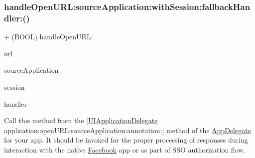 \subsubsection{\texorpdfstring{handle\+Open\+U\+R\+L\+:source\+Application\+:with\+Session\+:fallback\+Handler\+:()}{handleOpenURL:sourceApplication:withSession:fallbackHandler:()}\hspace{0.1cm}{\footnotesize\ttfamily [2/5]}}
{\footnotesize\ttfamily + (B\+O\+OL) handle\+Open\+U\+R\+L\+: \begin{DoxyParamCaption}\item[{(N\+S\+U\+RL $\ast$)}]{url }\item[{sourceApplication:(N\+S\+String $\ast$)}]{source\+Application }\item[{withSession:(\hyperlink{interfaceFBSession}{F\+B\+Session} $\ast$)}]{session }\item[{fallbackHandler:(F\+B\+App\+Call\+Handler)}]{handler }\end{DoxyParamCaption}}

Call this method from the \mbox{[}\hyperlink{classUIApplicationDelegate-p}{U\+I\+Application\+Delegate} application\+:open\+U\+R\+L\+:source\+Application\+:annotation\+:\mbox{]} method of the \hyperlink{classAppDelegate}{App\+Delegate} for your app. It should be invoked for the proper processing of responses during interaction with the native \hyperlink{interfaceFacebook}{Facebook} app or as part of S\+SO authorization flow.


